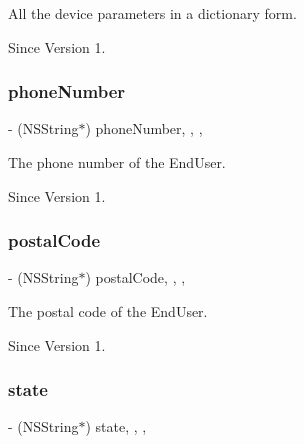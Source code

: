 All the device parameters in a dictionary form. 

\begin{DoxySince}{Since}
Version 1. 
\end{DoxySince}
\hypertarget{class_x_i_end_user_info_a84b3f0878ff55bca6fb70d26afc7911a}{}\label{class_x_i_end_user_info_a84b3f0878ff55bca6fb70d26afc7911a} 
\subsubsection{\texorpdfstring{phone\+Number}{phoneNumber}}
{\footnotesize\ttfamily -\/ (N\+S\+String$\ast$) phone\+Number\hspace{0.3cm}{\ttfamily [read]}, {\ttfamily [write]}, {\ttfamily [nonatomic]}, {\ttfamily [assign]}}



The phone number of the End\+User. 

\begin{DoxySince}{Since}
Version 1. 
\end{DoxySince}
\hypertarget{class_x_i_end_user_info_a9d17baddb2a8dc5a664338fbb54eaa83}{}\label{class_x_i_end_user_info_a9d17baddb2a8dc5a664338fbb54eaa83} 
\subsubsection{\texorpdfstring{postal\+Code}{postalCode}}
{\footnotesize\ttfamily -\/ (N\+S\+String$\ast$) postal\+Code\hspace{0.3cm}{\ttfamily [read]}, {\ttfamily [write]}, {\ttfamily [nonatomic]}, {\ttfamily [assign]}}



The postal code of the End\+User. 

\begin{DoxySince}{Since}
Version 1. 
\end{DoxySince}
\hypertarget{class_x_i_end_user_info_aa1c7962d0b2d0e793dde50d8e4cb2978}{}\label{class_x_i_end_user_info_aa1c7962d0b2d0e793dde50d8e4cb2978} 
\subsubsection{\texorpdfstring{state}{state}}
{\footnotesize\ttfamily -\/ (N\+S\+String$\ast$) state\hspace{0.3cm}{\ttfamily [read]}, {\ttfamily [write]}, {\ttfamily [nonatomic]}, {\ttfamily [assign]}}



